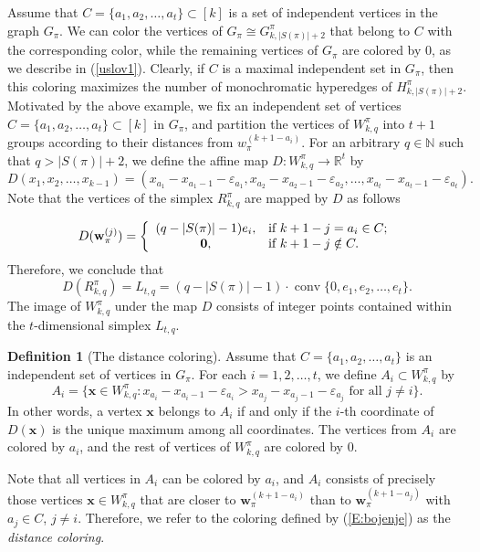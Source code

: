 \documentclass{birkjour}
\theoremstyle{definition}
\newtheorem{defn}[thm]{Definition}
\theoremstyle{remark}
\numberwithin{equation}{section}
\begin{document}
 Assume that
$C=\{a_1,a_2,\ldots,a_{t}\} \subset [k]$ is a set of independent
vertices in the graph $G_\pi$. We can color the vertices of
$G_\pi\cong G^\pi_{k,|S(\pi)|+2}$ that belong to $C$
  with the corresponding color, while the remaining
  vertices of $G_\pi$ are colored
by $0$, as we describe in (\ref{uslov1}). Clearly, if $C$ is a
maximal independent set in $G_\pi$, then this coloring maximizes
the number of monochromatic hyperedges of $H^\pi_{k,|S(\pi)|+2}$.
 Motivated by the above example, we fix an independent set of vertices
$C=\{a_1,a_2,\ldots,a_t\}\subset [k]$ in $G_\pi$, and partition
the vertices of $W_{k,q}^\pi$ into $t+1$ groups according to their
distances from $w_\pi^{(k+1-a_i)}$. For an arbitrary $q\in
\mathbb{N}$ such that $q>|S(\pi)|+2$, we define the affine map
$D:W ^\pi_{k,q}\rightarrow \mathbb{R}^t$ by
$$D(x_1,x_2,\ldots,x_{k-1})=(x_{a_1}-x_{a_1-1}-\varepsilon_{a_1},
x_{a_2}-x_{a_2-1}-\varepsilon_{a_2},\ldots
,x_{a_t}-x_{a_t-1}-\varepsilon_{a_t} ).$$
 Note that the vertices of the simplex $R^\pi_{k,q}$ are mapped by
 $D$ as follows

$$D(\mathbf{w}^{(j)}_\pi)=\left\{%
\begin{array}{cl}
    (q-|S(\pi)|-1)e_i, & \hbox{if $k+1-j=a_i\in C$;} \\
   \mathbf{0}, & \hbox{if $k+1-j \notin C.$} \\
\end{array}%
\right.    $$
Therefore, we conclude that
$$D(R^\pi_{k,q})=L_{t,q}=(q-|S(\pi)|-1)\cdot
\operatorname{conv}\{0,e_1,e_2,\ldots,e_{t}\} .$$ The image of
$W^\pi_{k,q}$ under the map $D$ consists of integer points
contained within the $t$-dimensional simplex $L_{t,q}$.

\begin{defn}[The distance coloring]\label{D:distcol} Assume that
$C=\{a_1,a_2,\ldots,a_t\}$ is an independent set of vertices in
$G_\pi$. For each $i=1,2,\ldots,t$, we define $A_i\subset
W^\pi_{k,q}$ by
\begin{equation}\label{E:bojenje}
A_i=\big\{\mathbf{x}\in
W^\pi_{k,q}:x_{a_i}-x_{a_i-1}-\varepsilon_{a_i}>
x_{a_j}-x_{a_j-1}- \varepsilon_{a_j}\textrm{ for all } j \neq
i\big\}.
\end{equation}
In other words, a vertex $\mathbf{x}$ belongs to $A_i$ if and only
if the $i$-th coordinate of $D(\mathbf{x})$ is the unique maximum
among all coordinates. The vertices from $A_i$ are colored by
$a_i$, and the rest of vertices of $W^\pi_{k,q}$ are colored by
$0$.
\end{defn}
Note that all vertices in $A_i$ can be colored by $a_i$, and $A_i$
consists of precisely those vertices $\mathbf{x}\in W^\pi_{k,q}$
that are closer to $\mathbf{w}^{(k+1-a_i)}_\pi$ than to
$\mathbf{w}^{(k+1-a_j)}_\pi$ with $a_j\in C$, $j\neq i$.
Therefore, we refer to the coloring defined by (\ref{E:bojenje})
as the \emph{distance coloring}.
\end{document}
